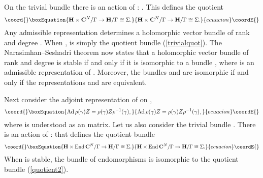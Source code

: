 \documentclass[a4paper,a4paper]{article}
\begin{document}
On the trivial bundle \coordHE{} there is an action of \myHighlight{$\Gamma$}\coordHE{}:  
\coordHE{}.  This defines the quotient  
\begin{equation}\coord{}\boxEquation{  
{{\bf H}}\times {{\bf C}}^N/\Gamma\rightarrow {{\bf H}}/\Gamma\cong\Sigma.  
\label{trivialquot}  
}{  
{{\bf H}}\times {{\bf C}}^N/\Gamma\rightarrow {{\bf H}}/\Gamma\cong\Sigma.  
}{ecuacion}\coordE{}\end{equation}  
Any admissible representation determines a holomorphic vector bundle  
\coordHE{} of rank \coordHE{} and degree \coordHE{}. When \coordHE{},  
\coordHE{} is simply the  quotient bundle (\ref{trivialquot}).  
The Narasimhan--Seshadri theorem  now states that a holomorphic vector bundle 
\coordHE{} of rank \coordHE{} 
and degree  \coordHE{}  is stable if and only if it is isomorphic to a  bundle 
\coordHE{}, where \myHighlight{$\rho$}\coordHE{}  is an admissible representation of \myHighlight{$\Gamma$}\coordHE{}. 
Moreover, the bundles \coordHE{} and \coordHE{} are isomorphic  
if and only if the representations \coordHE{} and \coordHE{} are equivalent.

Next consider the adjoint representation of \myHighlight{$\Gamma$}\coordHE{} on \coordHE{},  
\begin{equation}\coord{}\boxEquation{  
{\rm Ad}\,\rho (\gamma) Z =\rho (\gamma) Z \rho^{-1}(\gamma),  
\label{aggiunta}  
}{  
{\rm Ad}\,\rho (\gamma) Z =\rho (\gamma) Z \rho^{-1}(\gamma),  
}{ecuacion}\coordE{}\end{equation}  
where \coordHE{} is understood as an \coordHE{} matrix.  Let us  
also consider the trivial bundle \coordHE{}. There is an action of \myHighlight{$\Gamma$}\coordHE{}:  
\coordHE{} that defines the quotient bundle  
\begin{equation}\coord{}\boxEquation{  
{{\bf H}}\times {\rm End}\, {{\bf C}}^N/\Gamma\rightarrow  
{{\bf H}}/ \Gamma\cong\Sigma.  
\label{quotient2}
}{  
{{\bf H}}\times {\rm End}\, {{\bf C}}^N/\Gamma\rightarrow  
{{\bf H}}/ \Gamma\cong\Sigma.  
}{ecuacion}\coordE{}\end{equation}  
When \coordHE{} is stable, the bundle of endomorphisms \coordHE{} is isomorphic to the quotient bundle  
(\ref{quotient2}).  
  
\end{document}
